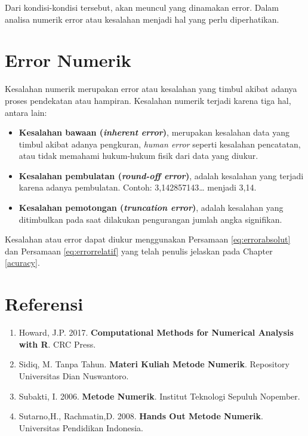 \documentclass[
]{book}
\providecommand{\tightlist}{%
  \setlength{\itemsep}{0pt}\setlength{\parskip}{0pt}}
\theoremstyle{definition}
\theoremstyle{definition}
\theoremstyle{definition}
\theoremstyle{definition}
\theoremstyle{remark}
\begin{document}
Dari kondisi-kondisi tersebut, akan meuncul yang dinamakan error. Dalam analisa numerik error atau kesalahan menjadi hal yang perlu diperhatikan.

\hypertarget{numerror}{%
\section{Error Numerik}\label{numerror}}

Kesalahan numerik merupakan error atau kesalahan yang timbul akibat adanya proses pendekatan atau hampiran. Kesalahan numerik terjadi karena tiga hal, antara lain:

\begin{itemize}
\item
  \textbf{Kesalahan bawaan (\emph{inherent error})}, merupakan kesalahan data yang timbul akibat adanya pengkuran, \emph{human error} seperti kesalahan pencatatan, atau tidak memahami hukum-hukum fisik dari data yang diukur.
\item
  \textbf{Kesalahan pembulatan (\emph{round-off error})}, adalah kesalahan yang terjadi karena adanya pembulatan. Contoh: 3,142857143\ldots{} menjadi 3,14.
\item
  \textbf{Kesalahan pemotongan (\emph{truncation error})}, adalah kesalahan yang ditimbulkan pada saat dilakukan pengurangan jumlah angka signifikan.
\end{itemize}

Kesalahan atau error dapat diukur menggunakan Persamaan \eqref{eq:errorabsolut} dan Persamaan \eqref{eq:errorrelatif} yang telah penulis jelaskan pada Chapter \ref{acuracy}.

\hypertarget{referensi-4}{%
\section{Referensi}\label{referensi-4}}

\begin{enumerate}
\def\labelenumi{\arabic{enumi}.}
\tightlist
\item
  Howard, J.P. 2017. \textbf{Computational Methods for Numerical Analysis with R}. CRC Press.
\item
  Sidiq, M. Tanpa Tahun. \textbf{Materi Kuliah Metode Numerik}. Repository Universitas Dian Nuswantoro.
\item
  Subakti, I. 2006. \textbf{Metode Numerik}. Institut Teknologi Sepuluh Nopember.
\item
  Sutarno,H., Rachmatin,D. 2008. \textbf{Hands Out Metode Numerik}. Universitas Pendidikan Indonesia.
\end{enumerate}
\end{document}
